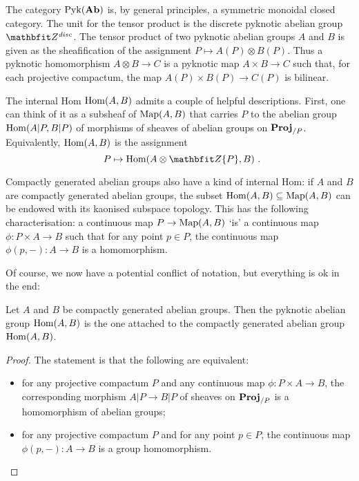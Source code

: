 \begin{cnstr}
	The category $ \operatorname{Pyk}(\textbf{\textup{Ab}}) $ is, by general principles, a symmetric monoidal closed category.
	The unit for the tensor product is the discrete pyknotic abelian group $ \ZZ^{\disc} $.
	The tensor product of two pyknotic abelian groups $ A $ and $ B $ is given as the sheafification of the assignment $ P \mapsto A(P) \otimes B(P) $.
	Thus a pyknotic homomorphism $ A \otimes B \to C $ is a pyknotic map $ A \times B \to C $ such that, for each projective compactum, the map $ A(P) \times B(P) \to C(P) $ is bilinear.

	The internal Hom $ \operatorname{Hom}(A, B) $ admits a couple of helpful descriptions.
	First, one can think of it as a subsheaf of $ \operatorname{Map}(A, B)$ that carries $ P $ to the abelian group $ \operatorname{Hom}(A|P, B|P) $ of morphisms of sheaves of abelian groups on $ \textbf{\textup{Proj}}_{/P} $.
	Equivalently, $ \operatorname{Hom}(A, B) $ is the assignment 
	\[
		P \mapsto \Hom(A \otimes \ZZ \{ P \}, B) \period
	\]
\end{cnstr}

\begin{nul}
	Compactly generated abelian groups also have a kind of internal Hom:
	if $ A $ and $ B $ are compactly generated abelian groups, the subset $ \operatorname{Hom}(A, B) \subseteq \operatorname{Map}(A, B)$ can be endowed with its kaonised subspace topology.
	This has the following characterisation: a continuous map $ P \to \operatorname{Map}(A, B) $ `is' a continuous map $ \phi \colon P \times A \to B $ such that for any point $ p \in P $, the continuous map $ \phi(p, -) \colon A \to B $ is a homomorphism.
\end{nul}

Of course, we now have a potential conflict of notation, but everything is ok in the end:

\begin{prp}
	Let $ A $ and $ B $ be compactly generated abelian groups.
	Then the pyknotic abelian group $ \operatorname{Hom}(A, B) $ is the one attached to the compactly generated abelian group $ \operatorname{Hom}(A, B) $.
\end{prp}

\begin{proof}
	The statement is that the following are equivalent:
	\begin{itemize}
		\item for any projective compactum $ P $ and any continuous map $ \phi \colon P \times  A \to B $, the corresponding morphism $ A|P \to B|P $ of sheaves on $ \textbf{\textup{Proj}}_{/P} $ is a homomorphism  of abelian groups;
		\item for any projective compactum $ P $ and for any point $ p \in P $, the continuous map $ \phi(p, -) \colon A \to B $ is a group homomorphism. \qedhere
	\end{itemize}
\end{proof}

